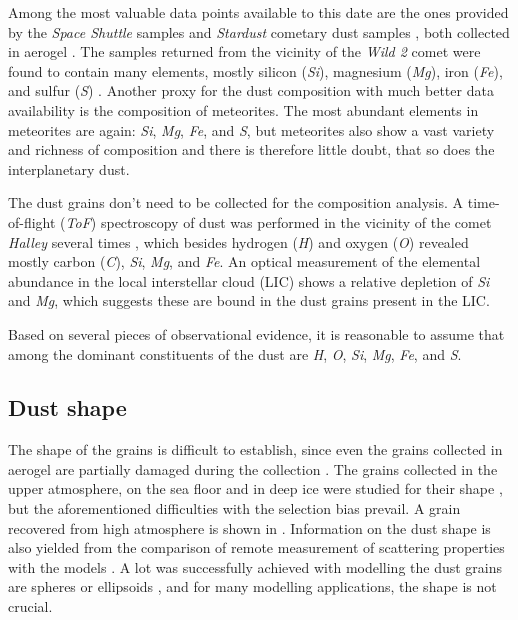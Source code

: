 Among the most valuable data points available to this date are the ones provided by the \textit{Space Shuttle} samples \citep{mcdonnell1984cosmic} and \textit{Stardust} cometary dust samples \citep{brownlee2014stardust}, both collected in aerogel \citep{tsou1995silica}. The samples returned from the vicinity of the \textit{Wild 2} comet were found to contain many elements, mostly silicon (\textit{Si}), magnesium (\textit{Mg}), iron (\textit{Fe}), and sulfur (\textit{S}) \citep{keller2006infrared}. Another proxy for the dust composition with much better data availability is the composition of meteorites. The most abundant elements in meteorites are again: \textit{Si}, \textit{Mg}, \textit{Fe}, and \textit{S}, but meteorites also show a vast variety and richness of composition \citep{anders1964origin} and there is therefore little doubt, that so does the interplanetary dust. 

The dust grains don't need to be collected for the composition analysis. A time-of-flight (\textit{ToF}) spectroscopy of dust was performed in the vicinity of the comet \textit{Halley} several times \citep{jessberger1988aspects}, which besides hydrogen (\textit{H}) and oxygen (\textit{O}) revealed mostly carbon (\textit{C}), \textit{Si}, \textit{Mg}, and \textit{Fe}. An optical measurement of the elemental abundance in the local interstellar cloud (LIC) shows a relative depletion of \textit{Si} and \textit{Mg}, which suggests these are bound in the dust grains present in the LIC. 

Based on several pieces of observational evidence, it is reasonable to assume that among the dominant constituents of the dust are \textit{H}, \textit{O}, \textit{Si}, \textit{Mg}, \textit{Fe}, and \textit{S}.

\subsection{Dust shape}

The shape of the grains is difficult to establish, since even the grains collected in aerogel are partially damaged during the collection \citep{burchell2006cosmic}. The grains collected in the upper atmosphere, on the sea floor and in deep ice were studied for their shape \citep{jessberger2001properties}, but the aforementioned difficulties with the selection bias prevail. A grain recovered from high atmosphere is shown in . Information on the dust shape is also yielded from the comparison of remote measurement of scattering properties with the models \citep{min2005modeling}. A lot was successfully achieved with modelling the dust grains are spheres or ellipsoids \citep{mann2010interstellar}, and for many modelling applications, the shape is not crucial.

